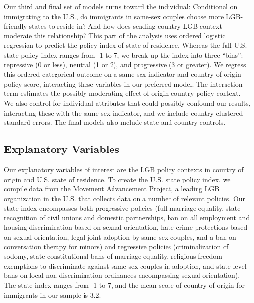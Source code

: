 \documentclass[
  12pt,
]{article}
\begin{document}
Our third and final set of models turns toward the individual: Conditional on immigrating to the U.S., do immigrants in same-sex couples choose more LGB-friendly states to reside in? And how does sending-country LGB context moderate this relationship? This part of the analysis uses ordered logistic regression to predict the policy index of state of residence. Whereas the full U.S. state policy index ranges from -1 to 7, we break up the index into three ``bins'': repressive (0 or less), neutral (1 or 2), and progressive (3 or greater). We regress this ordered categorical outcome on a same-sex indicator and country-of-origin policy score, interacting these variables in our preferred model. The interaction term estimates the possibly moderating effect of origin-country policy context. We also control for individual attributes that could possibly confound our results, interacting these with the same-sex indicator, and we include country-clustered standard errors. The final models also include state and country controls.

\hypertarget{explanatory-variables}{%
\subsection{Explanatory Variables}\label{explanatory-variables}}

Our explanatory variables of interest are the LGB policy contexts in country of origin and U.S. state of residence. To create the U.S. state policy index, we compile data from the Movement Advancement Project, a leading LGB organization in the U.S. that collects data on a number of relevant policies. Our state index encompasses both progressive policies (full marriage equality, state recognition of civil unions and domestic partnerships, ban on all employment and housing discrimination based on sexual orientation, hate crime protections based on sexual orientation, legal joint adoption by same-sex couples, and a ban on conversation therapy for minors) and regressive policies (criminalization of sodomy, state constitutional bans of marriage equality, religious freedom exemptions to discriminate against same-sex couples in adoption, and state-level bans on local non-discrimination ordinances encompassing sexual orientation). The state index ranges from -1 to 7, and the mean score of country of origin for immigrants in our sample is 3.2.
\end{document}
